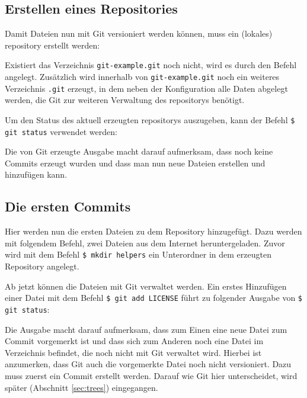 \subsection{Erstellen eines Repositories}\label{startup}
Damit Dateien nun mit Git versioniert werden können, muss ein (lokales)
\gls{repository} erstellt werden:


Existiert das Verzeichnis \texttt{git-example.git} noch nicht, wird es durch
den Befehl angelegt. Zusätzlich wird innerhalb von \texttt{git-example.git}
noch ein weiteres Verzeichnis \texttt{.git} erzeugt, in dem neben der
Konfiguration alle Daten abgelegt werden, die Git zur weiteren Verwaltung des
\glspl{repository} benötigt.

Um den Status des aktuell erzeugten \glspl{repository} auszugeben, kann der
Befehl \texttt{\$ git status} verwendet werden:


Die von Git erzeugte Ausgabe macht darauf aufmerksam, dass noch keine Commits
erzeugt wurden und dass man nun neue Dateien erstellen und hinzufügen kann.

\subsection{Die ersten Commits}\label{sec:first_commits}

Hier werden nun die ersten Dateien zu dem Repository hinzugefügt. Dazu werden
mit folgendem Befehl, zwei Dateien aus dem Internet heruntergeladen. Zuvor wird
mit dem Befehl \texttt{\$ mkdir helpers} ein Unterordner in dem erzeugten
Repository angelegt.


Ab jetzt können die Dateien mit Git verwaltet werden. Ein erstes Hinzufügen
einer Datei mit dem Befehl \texttt{\$ git add LICENSE} führt zu folgender
Ausgabe von \texttt{\$ git status}:


Die Ausgabe macht darauf aufmerksam, dass zum Einen eine neue Datei zum Commit
vorgemerkt ist und dass sich zum Anderen noch eine Datei im Verzeichnis
befindet, die noch nicht mit Git verwaltet wird. Hierbei ist anzumerken, dass
Git auch die vorgemerkte Datei noch nicht versioniert. Dazu muss zuerst ein
Commit erstellt werden. Darauf wie Git hier unterscheidet, wird später
(Abschnitt \ref{sec:trees}) eingegangen.

